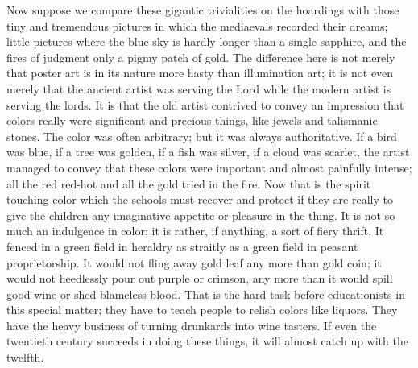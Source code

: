 \documentclass{book}
\begin{document}
Now suppose we compare these gigantic trivialities on the hoardings with those tiny and tremendous pictures in which the mediaevals recorded their dreams; little pictures where the blue sky is hardly longer than a single sapphire, and the fires of judgment only a pigmy patch of gold. The difference here is not merely that poster art is in its nature more hasty than illumination art; it is not even merely that the ancient artist was serving the Lord while the modern artist is serving the lords. It is that the old artist contrived to convey an impression that colors really were significant and precious things, like jewels and talismanic stones. The color was often arbitrary; but it was always authoritative. If a bird was blue, if a tree was golden, if a fish was silver, if a cloud was scarlet, the artist managed to convey that these colors were important and almost painfully intense; all the red red-hot and all the gold tried in the fire. Now that is the spirit touching color which the schools must recover and protect if they are really to give the children any imaginative appetite or pleasure in the thing. It is not so much an indulgence in color; it is rather, if anything, a sort of fiery thrift. It fenced in a green field in heraldry as straitly as a green field in peasant proprietorship. It would not fling away gold leaf any more than gold coin; it would not heedlessly pour out purple or crimson, any more than it would spill good wine or shed blameless blood. That is the hard task before educationists in this special matter; they have to teach people to relish colors like liquors. They have the heavy business of turning drunkards into wine tasters. If even the twentieth century succeeds in doing these things, it will almost catch up with the twelfth.
\end{document}
